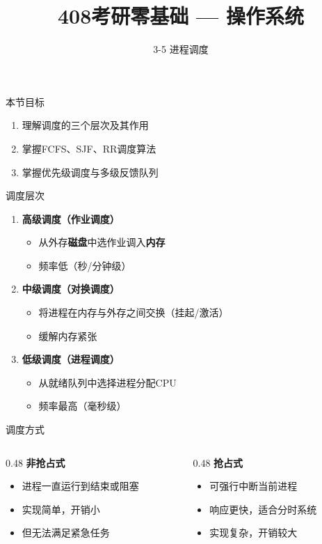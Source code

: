 \documentclass[10pt, aspectratio=169]{beamer}
\title{408考研零基础 --- 操作系统}
\subtitle{3-5 进程调度}
\author{}
\date{}
\begin{document}
\begin{frame}{本节目标}
    \begin{enumerate}
        \item 理解调度的三个层次及其作用
        \item 掌握FCFS、SJF、RR调度算法
        \item 掌握优先级调度与多级反馈队列
    \end{enumerate}
\end{frame}

\begin{frame}{调度层次}
    \begin{enumerate}
        \item \textbf{高级调度（作业调度）}
        \begin{itemize}
            \item 从外存\textbf{磁盘}中选作业调入\textbf{内存}
            \item 频率低（秒/分钟级）
        \end{itemize}
        \item \textbf{中级调度（对换调度）}
        \begin{itemize}
            \item 将进程在内存与外存之间交换（挂起/激活）
            \item 缓解内存紧张
        \end{itemize}
        \item \textbf{低级调度（进程调度）}
        \begin{itemize}
            \item 从就绪队列中选择进程分配CPU
            \item 频率最高（毫秒级）
        \end{itemize}
    \end{enumerate}
\end{frame}

\begin{frame}{调度方式}
    \begin{columns}
        \begin{column}{0.48\textwidth}
            \textbf{非抢占式}
            \begin{itemize}
                \item 进程一直运行到结束或阻塞
                \item 实现简单，开销小
                \item 但无法满足紧急任务
            \end{itemize}
        \end{column}
        \begin{column}{0.48\textwidth}
            \textbf{抢占式}
            \begin{itemize}
                \item 可强行中断当前进程
                \item 响应更快，适合分时系统
                \item 实现复杂，开销较大
            \end{itemize}
        \end{column}
    \end{columns}
\end{frame}
\end{document}
